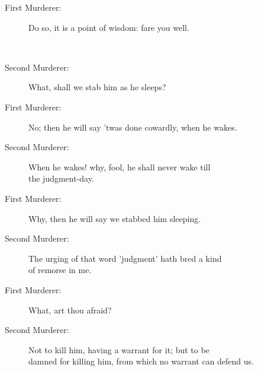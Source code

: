 \documentclass{article}
\begin{document}
\begin{description}
\item[First Murderer:] 
\hspace{1pt}Do so, it is a point of wisdom: fare you well.\\
\end{description}
\\
\begin{description}
\item[Second Murderer:] 
\hspace{1pt}What, shall we stab him as he sleeps?\\
\end{description}
\begin{description}
\item[First Murderer:] 
\hspace{1pt}No; then he will say 'twas done cowardly, when he wakes.\\
\end{description}
\begin{description}
\item[Second Murderer:] 
\hspace{1pt}When he wakes! why, fool, he shall never wake till\\
\hspace{1pt}the judgment-day.\\
\end{description}
\begin{description}
\item[First Murderer:] 
\hspace{1pt}Why, then he will say we stabbed him sleeping.\\
\end{description}
\begin{description}
\item[Second Murderer:] 
\hspace{1pt}The urging of that word 'judgment' hath bred a kind\\
\hspace{1pt}of remorse in me.\\
\end{description}
\begin{description}
\item[First Murderer:] 
\hspace{1pt}What, art thou afraid?\\
\end{description}
\begin{description}
\item[Second Murderer:] 
\hspace{1pt}Not to kill him, having a warrant for it; but to be\\
\hspace{1pt}damned for killing him, from which no warrant can defend us.\\
\end{description}
\end{document}

